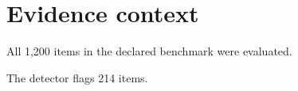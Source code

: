 \section{Evidence context}
All 1,200 items in the declared benchmark were evaluated.

The detector flags 214 items.
